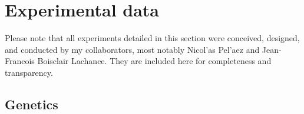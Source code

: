 \graphicspath{ {./figures/ratio/} }



\section{Experimental data}

Please note that all experiments detailed in this section were conceived, designed, and conducted by my collaborators, most notably Nicol'{a}s Pel'{a}ez and Jean-Francois Boisclair Lachance. They are included here for completeness and transparency.

\subsection{Genetics}
\label{appendix:methods:ratio:genetics}

